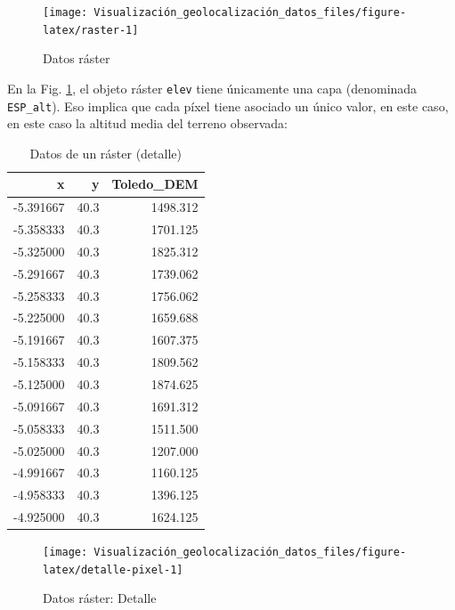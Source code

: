 \documentclass[
]{report}
\theoremstyle{definition}
\theoremstyle{definition}
\theoremstyle{definition}
\theoremstyle{definition}
\theoremstyle{remark}
\begin{document}
\begin{figure}

{\centering \texttt{[image: Visualización\_geolocalización\_datos\_files/figure-latex/raster-1]} 

}

\caption{Datos ráster}\label{fig:raster}
\end{figure}

En la Fig. \ref{fig:raster}, el objeto ráster \texttt{elev} tiene únicamente una capa
(denominada \texttt{ESP\_alt}). Eso implica que cada píxel tiene asociado un único
valor, en este caso, en este caso la altitud media del terreno observada:

\begin{table}

\caption{\label{tab:detalle-pixel}Datos de un ráster (detalle)}
\centering
\begin{tabular}[t]{r|r|r}
\hline
x & y & Toledo\_DEM\\
\hline
-5.391667 & 40.3 & 1498.312\\
\hline
-5.358333 & 40.3 & 1701.125\\
\hline
-5.325000 & 40.3 & 1825.312\\
\hline
-5.291667 & 40.3 & 1739.062\\
\hline
-5.258333 & 40.3 & 1756.062\\
\hline
-5.225000 & 40.3 & 1659.688\\
\hline
-5.191667 & 40.3 & 1607.375\\
\hline
-5.158333 & 40.3 & 1809.562\\
\hline
-5.125000 & 40.3 & 1874.625\\
\hline
-5.091667 & 40.3 & 1691.312\\
\hline
-5.058333 & 40.3 & 1511.500\\
\hline
-5.025000 & 40.3 & 1207.000\\
\hline
-4.991667 & 40.3 & 1160.125\\
\hline
-4.958333 & 40.3 & 1396.125\\
\hline
-4.925000 & 40.3 & 1624.125\\
\hline
\end{tabular}
\end{table}

\begin{figure}

{\centering \texttt{[image: Visualización\_geolocalización\_datos\_files/figure-latex/detalle-pixel-1]} 

}

\caption{Datos ráster: Detalle}\label{fig:detalle-pixel}
\end{figure}
\end{document}
